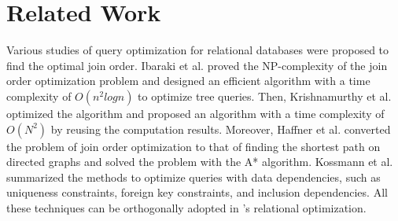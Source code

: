 
\section{Related Work}
\label{sec:related-work}


Various studies of query optimization for relational databases were proposed to find the optimal join order.
Ibaraki et al.\cite{IbarakiK84} proved the NP-complexity of the join order optimization problem and designed an efficient algorithm with a time complexity of $O(n^2logn)$ to optimize tree queries.
Then, Krishnamurthy et al.\cite{optimize-nested-vldb-1986} optimized the algorithm and proposed an algorithm with a time complexity of $O(N^2)$ by reusing the computation results.
Moreover, Haffner et al.\cite{Haffnerjoinorder} converted the problem of join order optimization to that of finding the shortest path on directed graphs and solved the problem with the A* algorithm. 
Kossmann et al.\cite{data-dependency-join} summarized the methods to optimize queries with data dependencies, such as uniqueness constraints, foreign key constraints, and inclusion dependencies.
All these techniques can be orthogonally adopted in \name's relational optimization.

